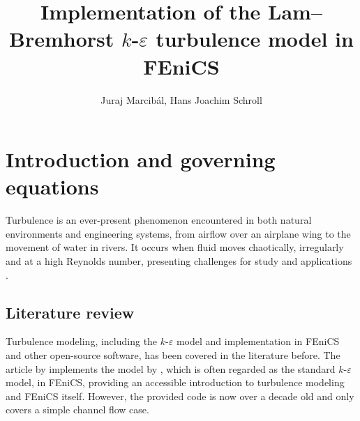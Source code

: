 \graphicspath{{chapters/marcibal/graphics/}} 

\title{Implementation of the Lam--Bremhorst \texorpdfstring{\(k\)-\(\varepsilon\)}{k-e} turbulence model in FEniCS}

\author{Juraj Marcibál, Hans Joachim Schroll}


\maketitle



\section{Introduction and governing equations}

Turbulence is an ever-present phenomenon encountered in both natural environments and engineering systems, from airflow over an airplane wing to the movement of water in rivers. It occurs when fluid moves chaotically, irregularly and at a high Reynolds number, presenting challenges for study and applications \citep{wilcox_turbulence_2006}. 

\subsection{Literature review}

Turbulence modeling, including the \(k\)-\(\varepsilon\) model and implementation in FEniCS and other open-source software, has been covered in the literature before. The article by \cite{valen_implementing_2013} implements the model by \citep{launder_application_1974}, which is often regarded as the standard \(k\)-\(\varepsilon\) model, in FEniCS, providing an accessible introduction to turbulence modeling and FEniCS itself. However, the provided code is now over a decade old and only covers a simple channel flow case. 

